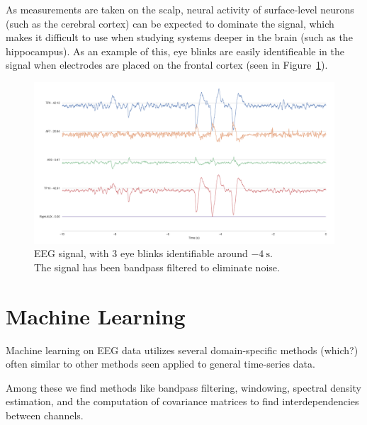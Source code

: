     As measurements are taken on the scalp, neural activity of surface-level neurons (such as the cerebral cortex) can be expected to dominate the signal, which makes it difficult to use when studying systems deeper in the brain (such as the hippocampus). As an example of this, eye blinks are easily identifieable in the signal when electrodes are placed on the frontal cortex (seen in Figure~\ref{fig:raweeg}).



    \begin{figure}
        \begin{center}
            \includegraphics[trim=60 50 50 60,clip,width=24cm]{img/raw-signal.png}
        \end{center}
        \caption{EEG signal, with 3 eye blinks identifiable around $\SI{-4}{\second}$.\\ The signal has been bandpass filtered to eliminate noise.}\label{fig:raweeg}
    \end{figure}

\section{Machine Learning}

    Machine learning on EEG data utilizes several domain-specific methods (which?) often similar to other methods seen applied to general time-series data.

    Among these we find methods like bandpass filtering, windowing, spectral density estimation, and the computation of covariance matrices to find interdependencies between channels.

